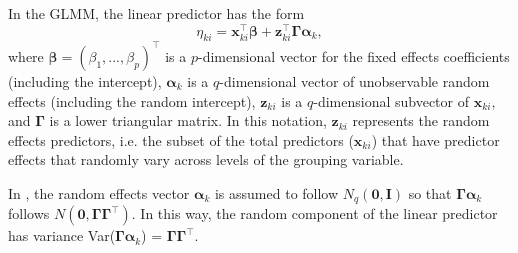 In the GLMM, the linear predictor has the form
\begin{equation}
  \eta_{ki} = \boldsymbol x_{ki}^\top \boldsymbol \beta + \boldsymbol z_{ki}^\top \boldsymbol \Gamma \boldsymbol \alpha_k,
  \label{eqn:linpred}
\end{equation} where \(\boldsymbol \beta = (\beta_1,...,\beta_{p})^\top\)
is a \(p\)-dimensional vector for the fixed effects coefficients (including the intercept),
\(\boldsymbol \alpha_k\) is a \(q\)-dimensional vector of unobservable
random effects (including the random intercept), \(\boldsymbol z_{ki}\) is a \(q\)-dimensional
subvector of \(\boldsymbol x_{ki}\), and \(\boldsymbol \Gamma\) is a
lower triangular matrix. In this notation, $\boldsymbol z_{ki}$ represents the random effects predictors, i.e. the subset of the total predictors ($\boldsymbol x_{ki}$) that have predictor effects that randomly vary across levels of the grouping variable.

In \cite{rashid2020}, the random effects vector \(\boldsymbol \alpha_k\)
is assumed to follow \(N_q(\boldsymbol 0, \boldsymbol I)\)
so that
\(\boldsymbol \Gamma \boldsymbol \alpha_k\) follows \(N(\boldsymbol 0, \boldsymbol{\Gamma \Gamma}^\top)\).
In this way, the random component of the linear predictor has variance
Var(\(\boldsymbol \Gamma \boldsymbol \alpha_k\)) =
\(\boldsymbol{\Gamma \Gamma}^\top\).

